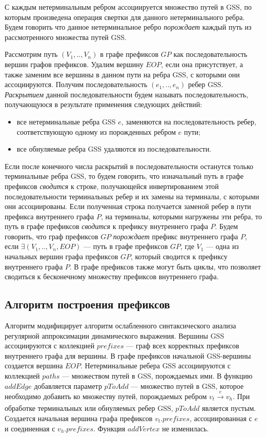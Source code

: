 С каждым нетерминальным ребром ассоциируется множество путей в GSS, по которым произведена операция свертки для данного нетерминального ребра. Будем говорить что данное нетерминальное ребро \emph{порождает} каждый путь из рассмотренного множества путей GSS.
% 

Рассмотрим путь $(V_{1},..,V_{n})$ в графе префиксов $GP$ как последовательность вершин графов префиксов. Удалим вершину $EOP$, если она присутствует, а также заменим все вершины в данном пути на ребра GSS, с которыми они ассоциируются. Получим последовательность $(e_{1},..,e_{n})$ ребер GSS. \emph{Раскрытием} данной последовательности будем называть последовательность, получающуюся в результате применения следующих действий:
\begin{itemize}
    \item все нетерминальные ребра GSS $e$, заменяются на последовательность ребер, соответствующую одному из порожденных ребром $e$ пути;
    \item все обнуляемые ребра GSS удаляются из последовательности.
\end{itemize}
Если после конечного числа раскрытий в последовательности останутся только терминальные ребра GSS, то будем говорить, что изначальный путь в графе префиксов \emph{сводится} к строке, получающейся инвертированием этой последовательности терминальных ребер и их замены на терминалы, с которыми они ассоциированы. Если полученная строка получается заменой ребер в пути префикса внутреннего графа $P$, на терминалы, которыми нагружены эти ребра, то путь в графе префиксов \emph{сводится} к префиксу внутреннего графа $P$. Будем говорить, что граф префиксов $GP$ \emph{порождает} префикс внутреннего графа $P$, если $\exists (V_{1},..,V_{n},EOP)$ --- путь в графе префиксов $GP$, где $V_{1}$ --- одна из начальных вершин графа префиксов $GP$, который сводится к префиксу внутреннего графа $P$. В графе префиксов также могут быть циклы, что позволяет сводиться к бесконечному множеству префиксов внутреннего графа.

\subsection{Алгоритм построения префиксов}
Алгоритм модифицирует алгоритм ослабленного синтаксического анализа регулярной аппроксимации динамического выражения. Вершины GSS ассоциируются с коллекцией $prefixes$ --- граф всех корректных префиксов внутреннего графа для вершины. В графе префиксов начальной GSS-вершины создается вершина $EOP$. Нетерминальные ребера GSS ассоциируются с коллекцией $paths$ --- множеством путей в GSS, порождаемых ими. В функцию $addEdge$ добавляется параметр $pToAdd$ --- множество путей в GSS, которое необходимо добавить ко множеству путей, порождаемых ребром $v_{t} \xrightarrow[]{e} v_{h}$. При обработке терминальных или обнуляемых ребер GSS, $pToAdd$ является пустым. Создается начальная вершина графа префиксов $v_{t}.prefixes$, ассоциированная с $e$ и соединенная с $v_{h}.prefixes$. Функция $addVertex$ не изменилась.


